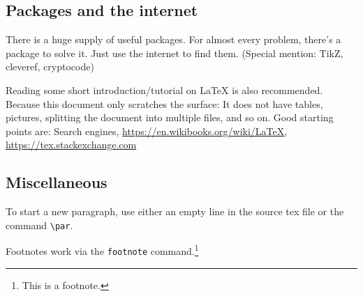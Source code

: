 \documentclass[11pt]{scrartcl}
\theoremstyle{plain} %
\theoremstyle{definition} %
\theoremstyle{remark} %
\begin{document}
\subsection{Packages and the internet}
\label{subsec:packages}

There is a huge supply of useful packages.
For almost every problem, there's a package to solve it.
Just use the internet to find them.
(Special mention: TikZ, cleveref, cryptocode)

Reading some short introduction/tutorial on \LaTeX{} is also recommended.
Because this document only scratches the surface:
It does not have tables, pictures, splitting the document into multiple files, and so on.
Good starting points are:
Search engines, \url{https://en.wikibooks.org/wiki/LaTeX}, \url{https://tex.stackexchange.com}



\subsection{Miscellaneous}
\label{subsec:misc}

To start a new paragraph, use either an empty line in the source tex file or the command \verb|\par|.

Footnotes work via the \verb|footnote| command.\footnote{This is a footnote.}





\printbibliography{}
\end{document}
